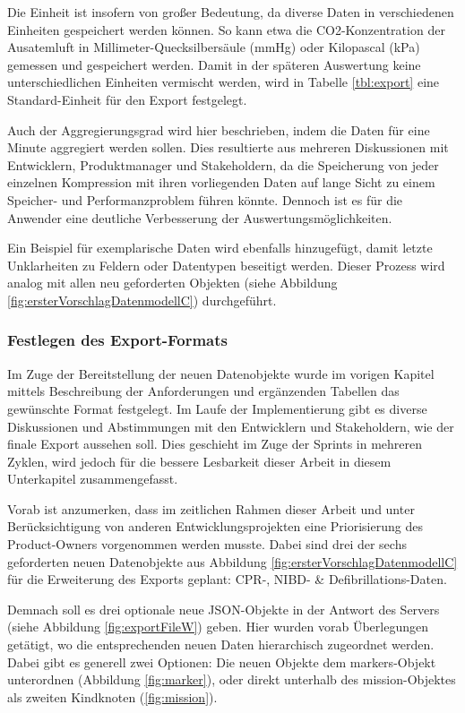 Die Einheit ist insofern von großer Bedeutung, da diverse Daten in verschiedenen Einheiten gespeichert werden können.
So kann etwa die CO2-Konzentration der Ausatemluft in Millimeter-Quecksilbersäule (mmHg) oder Kilopascal (kPa) gemessen und gespeichert werden.
Damit in der späteren Auswertung keine unterschiedlichen Einheiten vermischt werden, wird in Tabelle \ref{tbl:export} eine Standard-Einheit für den Export festgelegt.

Auch der Aggregierungsgrad wird hier beschrieben, indem die Daten für eine Minute aggregiert werden sollen.
Dies resultierte aus mehreren Diskussionen mit Entwicklern, Produktmanager und Stakeholdern, da die Speicherung von jeder einzelnen Kompression mit ihren vorliegenden Daten auf lange Sicht zu einem Speicher- und Performanzproblem führen könnte.
Dennoch ist es für die Anwender eine deutliche Verbesserung der Auswertungsmöglichkeiten.

Ein Beispiel für exemplarische Daten wird ebenfalls hinzugefügt, damit letzte Unklarheiten zu Feldern oder Datentypen beseitigt werden.
Dieser Prozess wird analog mit allen neu geforderten Objekten (siehe Abbildung \ref{fig:ersterVorschlagDatenmodellC}) durchgeführt. 

\subsubsection{Festlegen des Export-Formats}
Im Zuge der Bereitstellung der neuen Datenobjekte wurde im vorigen Kapitel mittels Beschreibung der Anforderungen und ergänzenden Tabellen das gewünschte Format festgelegt.
Im Laufe der Implementierung gibt es diverse Diskussionen und Abstimmungen mit den Entwicklern und Stakeholdern, wie der finale Export aussehen soll.
Dies geschieht im Zuge der \glqq Sprints\grqq{} in mehreren Zyklen, wird jedoch für die bessere Lesbarkeit dieser Arbeit in diesem Unterkapitel zusammengefasst.

Vorab ist anzumerken, dass im zeitlichen Rahmen dieser Arbeit und unter Berücksichtigung von anderen Entwicklungsprojekten eine Priorisierung des Product-Owners vorgenommen werden musste.
Dabei sind drei der sechs geforderten neuen Datenobjekte aus Abbildung \ref{fig:ersterVorschlagDatenmodellC} für die Erweiterung des Exports  geplant: \gls{CPR}-, \gls{NIBD}- \& Defibrillations-Daten.

Demnach soll es drei optionale neue JSON-Objekte in der Antwort des Servers (siehe Abbildung \ref{fig:exportFileW}) geben.
Hier wurden vorab Überlegungen getätigt, wo die entsprechenden neuen Daten hierarchisch zugeordnet werden.
Dabei gibt es generell zwei Optionen:
Die neuen Objekte dem \glqq markers\grqq-Objekt unterordnen (Abbildung \ref{fig:marker}), oder direkt unterhalb des \glqq mission\grqq-Objektes als zweiten Kindknoten (\ref{fig:mission}).

